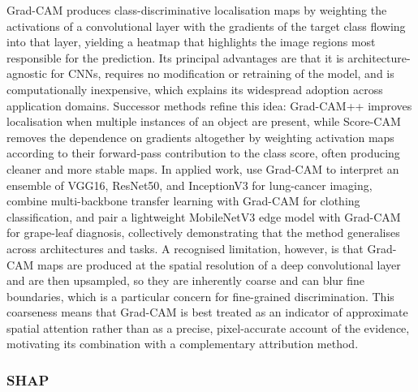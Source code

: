 Grad-CAM \citep{selvaraju2017gradcam} produces class-discriminative localisation maps by weighting the activations of a convolutional layer with the gradients of the target class flowing into that layer, yielding a heatmap that highlights the image regions most responsible for the prediction.
Its principal advantages are that it is architecture-agnostic for CNNs, requires no modification or retraining of the model, and is computationally inexpensive, which explains its widespread adoption across application domains.
Successor methods refine this idea: Grad-CAM++ \citep{chattopadhay2018gradcampp} improves localisation when multiple instances of an object are present, while Score-CAM \citep{wang2020scorecam} removes the dependence on gradients altogether by weighting activation maps according to their forward-pass contribution to the class score, often producing cleaner and more stable maps.
In applied work, \citet{kumaran2024lungcam} use Grad-CAM to interpret an ensemble of VGG16, ResNet50, and InceptionV3 for lung-cancer imaging, \citet{ahmed2024clothing} combine multi-backbone transfer learning with Grad-CAM for clothing classification, and \citet{karim2024grapeleaf} pair a lightweight MobileNetV3 edge model with Grad-CAM for grape-leaf diagnosis, collectively demonstrating that the method generalises across architectures and tasks.
A recognised limitation, however, is that Grad-CAM maps are produced at the spatial resolution of a deep convolutional layer and are then upsampled, so they are inherently coarse and can blur fine boundaries, which is a particular concern for fine-grained discrimination.
This coarseness means that Grad-CAM is best treated as an indicator of approximate spatial attention rather than as a precise, pixel-accurate account of the evidence, motivating its combination with a complementary attribution method.

\subsubsection{SHAP}
\label{subsubsec:shap}

